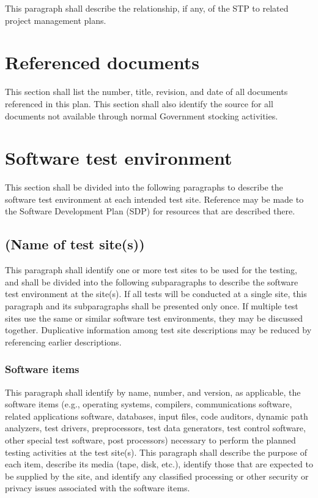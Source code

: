 \documentclass{fidata-report-template}
\begin{document}
This paragraph shall describe the relationship, if any, of the STP to
related project management plans.

\section{Referenced documents}

This section shall list the number, title, revision, and date of all
documents referenced in this plan. This section shall also identify the
source for all documents not available through normal Government
stocking activities.

\section{Software test environment}

This section shall be divided into the following paragraphs to describe
the software test environment at each intended test site. Reference may
be made to the Software Development Plan (SDP) for resources that are
described there.

\subsection{(Name of test site(s))}

This paragraph shall identify one or more test sites to be used for the
testing, and shall be divided into the following subparagraphs to
describe the software test environment at the site(s). If all tests will
be conducted at a single site, this paragraph and its subparagraphs
shall be presented only once. If multiple test sites use the same or
similar software test environments, they may be discussed together.
Duplicative information among test site descriptions may be reduced by
referencing earlier descriptions.

\subsubsection{Software items}

This paragraph shall identify by name, number, and version, as
applicable, the software items (e.g., operating systems, compilers,
communications software, related applications software, databases, input
files, code auditors, dynamic path analyzers, test drivers,
preprocessors, test data generators, test control software, other
special test software, post processors) necessary to perform the planned
testing activities at the test site(s). This paragraph shall describe
the purpose of each item, describe its media (tape, disk, etc.),
identify those that are expected to be supplied by the site, and
identify any classified processing or other security or privacy issues
associated with the software items.
\end{document}

